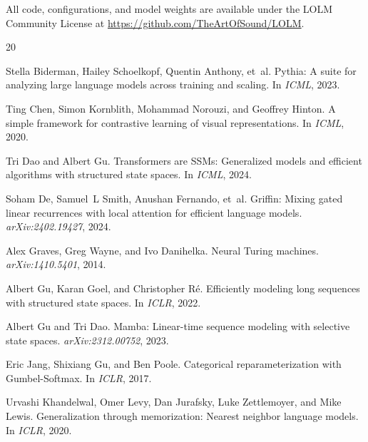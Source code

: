 \documentclass{article}
\begin{document}
All code, configurations, and model weights are available under the LOLM Community
License at \url{https://github.com/TheArtOfSound/LOLM}.



\begin{thebibliography}{20}

Stella Biderman, Hailey Schoelkopf, Quentin Anthony, et~al.
\newblock Pythia: A suite for analyzing large language models across training
  and scaling.
\newblock In \emph{ICML}, 2023.

Ting Chen, Simon Kornblith, Mohammad Norouzi, and Geoffrey Hinton.
\newblock A simple framework for contrastive learning of visual
  representations.
\newblock In \emph{ICML}, 2020.

Tri Dao and Albert Gu.
\newblock Transformers are SSMs: Generalized models and efficient algorithms
  with structured state spaces.
\newblock In \emph{ICML}, 2024.

Soham De, Samuel~L Smith, Anushan Fernando, et~al.
\newblock Griffin: Mixing gated linear recurrences with local attention for
  efficient language models.
\newblock \emph{arXiv:2402.19427}, 2024.

Alex Graves, Greg Wayne, and Ivo Danihelka.
\newblock Neural Turing machines.
\newblock \emph{arXiv:1410.5401}, 2014.

Albert Gu, Karan Goel, and Christopher R\'{e}.
\newblock Efficiently modeling long sequences with structured state spaces.
\newblock In \emph{ICLR}, 2022.

Albert Gu and Tri Dao.
\newblock Mamba: Linear-time sequence modeling with selective state spaces.
\newblock \emph{arXiv:2312.00752}, 2023.

Eric Jang, Shixiang Gu, and Ben Poole.
\newblock Categorical reparameterization with {Gumbel-Softmax}.
\newblock In \emph{ICLR}, 2017.

Urvashi Khandelwal, Omer Levy, Dan Jurafsky, Luke Zettlemoyer, and Mike Lewis.
\newblock Generalization through memorization: Nearest neighbor language models.
\newblock In \emph{ICLR}, 2020.


\end{thebibliography}
\end{document}
